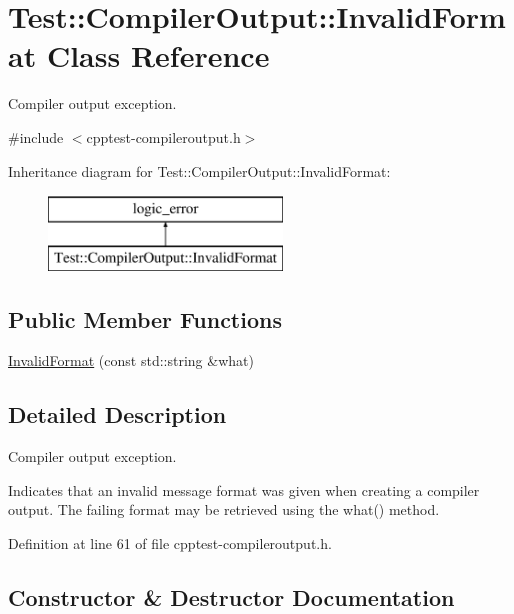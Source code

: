 \hypertarget{class_test_1_1_compiler_output_1_1_invalid_format}{}\section{Test\+:\+:Compiler\+Output\+:\+:Invalid\+Format Class Reference}
\label{class_test_1_1_compiler_output_1_1_invalid_format}


Compiler output exception.  




{\ttfamily \#include $<$cpptest-\/compileroutput.\+h$>$}

Inheritance diagram for Test\+:\+:Compiler\+Output\+:\+:Invalid\+Format\+:\begin{figure}[H]
\begin{center}
\leavevmode
\includegraphics[height=2.000000cm]{class_test_1_1_compiler_output_1_1_invalid_format}
\end{center}
\end{figure}
\subsection*{Public Member Functions}
\begin{DoxyCompactItemize}
\item 
\mbox{\hyperlink{class_test_1_1_compiler_output_1_1_invalid_format_a3a7ab44239805bcefd4bc19c48c91992}{Invalid\+Format}} (const std\+::string \&what)
\end{DoxyCompactItemize}


\subsection{Detailed Description}
Compiler output exception. 

Indicates that an invalid message format was given when creating a compiler output. The failing format may be retrieved using the what() method. 

Definition at line 61 of file cpptest-\/compileroutput.\+h.



\subsection{Constructor \& Destructor Documentation}
\mbox{\label{class_test_1_1_compiler_output_1_1_invalid_format_a3a7ab44239805bcefd4bc19c48c91992}} 
